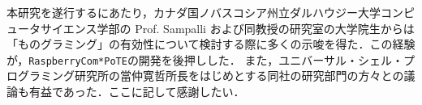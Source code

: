 


\begin{acknowledgment}

      本研究を遂行するにあたり，カナダ国ノバスコシア州立ダルハウジー大学コンピュータサイエンス学部の Prof. Sampalli および同教授の研究室の大学院生からは「ものグラミング」の有効性について検討する際に多くの示唆を得た．この経験が，{\tt Raspberry\-Com*PoTE}の開発を後押しした．
      また，ユニバーサル・シェル・プログラミング研究所の當仲寛哲所長をはじめとする同社の研究部門の方々との議論も有益であった．ここに記して感謝したい．

\end{acknowledgment}





